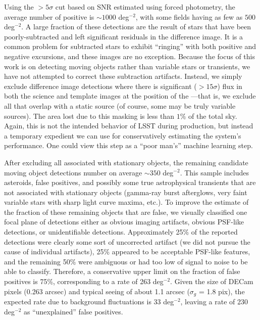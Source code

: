 Using the $>5\sigma$ cut based on SNR estimated using forced photometry,
the average number of positive \DIASources is $\sim 1000$ deg$^{-2}$,
with some fields having as few as $500$ deg$^{-2}$. A large fraction of
these detections are the result of stars that have been poorly-subtracted and
left significant residuals in the difference image. It is a common problem for
subtracted stars to exhibit ``ringing'' with both positive and negative
excursions, and these images are no exception. Because the focus of this work
is on detecting moving objects rather than variable stars or transients, we have
not attempted to correct these subtraction artifacts. Instead, we simply exclude
difference image detections where there is significant ($>15 \sigma$) flux in both the
science and template images at the position of the \DIASource---that is, we exclude all \DIASources that
overlap with a static source (of course, some may be truly variable sources).
The area lost due to this masking is less than $1\%$ of the total sky. Again, this
is not the intended behavior of LSST during production, but instead a temporary
expedient we can use for conservatively estimating the system's performance.
One could view this step as a ``poor man's'' machine learning step.

After excluding all \DIASources associated with stationary objects, the
remaining candidate moving object detections number on average $\sim 350$
deg$^{-2}$. This sample includes asteroids, false positives, and possibly some
true astrophysical transients that are not associated with stationary objects
(gamma-ray burst afterglows, very faint variable stars with sharp light
curve maxima, etc.). To improve the estimate of the fraction of these remaining
objects that are false, we visually classified one focal plane of detections either
as obvious imaging artifacts, obvious PSF-like detections, or unidentifiable
detections. Approximately 25\% of the reported detections were clearly some
sort of uncorrected artifact (we did not pursue the cause of individual artifacts),
25\% appeared to be acceptable PSF-like features, and the remaining 50\% were
ambiguous or had too low of signal to noise to be able to classify.
Therefore, a conservative upper limit on the fraction of false positives is 75\%,
corresponding to a rate of 263 deg$^{-2}$. Given the size of DECam pixels
(0.263 arcsec) and typical seeing of about 1.1 arcsec ($\sigma_g$ = 1.8 pix),
the expected rate due to background fluctuations is 33 deg$^{-2}$, leaving
a rate of 230 deg$^{-2}$ as ``unexplained'' false positives.

